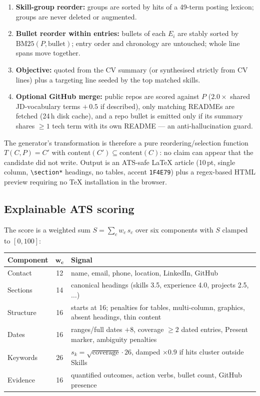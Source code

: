 \documentclass[11pt,a4paper]{article}
\newcommand{\code}[1]{\texttt{#1}}
\begin{document}
\begin{enumerate}[leftmargin=2.2em]
  \item \textbf{Skill-group reorder:} groups are sorted by hits of a
        49-term posting lexicon; groups are never deleted or augmented.
  \item \textbf{Bullet reorder within entries:} bullets of each $E_i$ are
        stably sorted by $\text{BM25}(P, \text{bullet})$; entry order and
        chronology are untouched; whole line spans move together.
  \item \textbf{Objective:} quoted from the CV summary (or synthesised
        strictly from CV lines) plus a targeting line seeded by the top
        matched skills.
  \item \textbf{Optional GitHub merge:} public repos are scored against $P$
        ($2.0\times$ shared JD-vocabulary terms $+\,0.5$ if described),
        only matching READMEs are fetched (24\,h disk cache), and a repo
        bullet is emitted only if its summary shares $\geq 1$ tech term with
        its own README --- an anti-hallucination guard.
\end{enumerate}

The generator's transformation is therefore a pure reordering/selection
function $T(C, P) = C'$ with
$\text{content}(C') \subseteq \text{content}(C)$: no claim can appear that
the candidate did not write. Output is an ATS-safe \LaTeX{} article
(10\,pt, single column, \code{\textbackslash section*} headings, no tables,
accent \texttt{1F4E79}) plus a regex-based HTML preview requiring no TeX
installation in the browser.

\subsection{Explainable ATS scoring}
\label{sec:ats}

The score is a weighted sum $S = \sum_{c} w_c\,s_c$ over six components
with $S$ clamped to $[0, 100]$:

\begin{center}
\begin{tabular}{@{}lcl@{}}
\toprule
\textbf{Component} & $\boldsymbol{w_c}$ & \textbf{Signal}\\
\midrule
Contact    & 12 & name, email, phone, location, LinkedIn, GitHub \\
Sections   & 14 & canonical headings (skills 3.5, experience 4.0,
                   projects 2.5, $\ldots$) \\
Structure  & 16 & starts at 16; penalties for tables, multi-column,
                   graphics, absent headings, thin content \\
Dates      & 16 & ranges/full dates $+$8, coverage $\geq 2$ dated entries,
                   Present marker, ambiguity penalties \\
Keywords   & 26 & $s_k = \sqrt{\text{coverage}}\cdot 26$, damped
                   $\times 0.9$ if hits cluster outside Skills \\
Evidence   & 16 & quantified outcomes, action verbs, bullet count,
                   GitHub presence \\
\bottomrule
\end{tabular}
\end{center}
\end{document}
